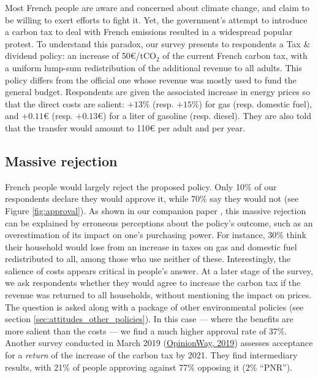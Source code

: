 \documentclass[english,5p,authoryear]{elsarticle}
\begin{document}
Most French people are aware and concerned about climate change, and claim to be willing to exert efforts to fight it. Yet, the government's attempt to introduce a carbon tax to deal with French emissions resulted in a widespread popular protest. To understand this paradox, our survey presents to respondents a Tax \& dividend policy: an increase of 50\euro{}/tCO$_2$ of the current French carbon tax, with a uniform lump-sum redistribution of the additional revenue to all adults. This policy differs from the official one whose revenue was mostly used to fund the general budget. Respondents are given the associated increase in energy prices so that the direct costs are salient: $+13\%$ (resp. $+15\%$) for gas (resp. domestic fuel), and $+0.11$\euro{} (resp. $+0.13$\euro{}) for a liter of gasoline (resp. diesel). They are also told that the transfer would amount to 110\euro{} per adult and per year. %

    \subsection{Massive rejection}


French people would largely reject the proposed policy. Only 10\% of our respondents declare they would approve it, while 70\% say they would not (see Figure \ref{fig:approval}). As shown in our companion paper \citep{douenne_can_2019}, this massive rejection can be explained by erroneous perceptions about the policy's outcome, such as an overestimation of its impact on one's purchasing power. For instance, 30\% think their household would lose from an increase in taxes on gas and domestic fuel redistributed to all, among those who use neither of these. Interestingly, the salience of costs appears critical in people's answer. At a later stage of the survey, we ask respondents whether they would agree to increase the carbon tax if the revenue was returned to all households, without mentioning the impact on prices. The question is asked along with a package of other environmental policies (see section \ref{sec:attitudes_other_policies}). In this case --- where the benefits are more salient than the costs --- we find a much higher approval rate of 37\%. Another survey conducted in March 2019 (\hyperlink{https://drive.google.com/file/d/1ne1nUsJJqY1PYFOs9dH9uK6mLw39R1QY/view}{OpinionWay, 2019}) assesses acceptance for a \textit{return} of the increase of the carbon tax by 2021. They find intermediary results, with 21\% of people approving against 77\% opposing it (2\% ``PNR'').
\end{document}
